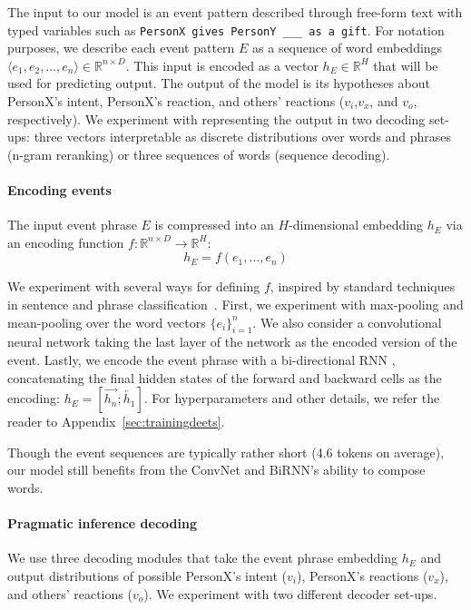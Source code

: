 \documentclass[11pt,a4paper]{article}
\begin{document}
The input to our model is an event pattern described through free-form text with typed variables such as \texttt{PersonX gives PersonY \_\_\_ as a gift}.
For notation purposes, we describe each event pattern $E$ as a sequence of word embeddings $\langle e_1, e_2, \ldots, e_n\rangle \in \mathbb{R}^{n\times D}$.  This input is encoded as a vector $h_E \in \mathbb{R}^H$ that will be used for predicting output.
The output of the model is its hypotheses about PersonX's intent, PersonX's reaction, and others' reactions ($v_i$,$ v_x$, and $v_o$, respectively).  We experiment with representing the output in two decoding set-ups: three vectors interpretable as discrete distributions over words and phrases (n-gram reranking) or three sequences of words (sequence decoding).  


\paragraph{Encoding events}
The input event phrase $E$ is compressed into an $H$-dimensional embedding $h_E$ via an encoding function $f: \mathbb{R}^{n\times D} \rightarrow \mathbb{R}^{H}$:
\[h_E = f(e_1, \ldots, e_n)\]

\noindent
We experiment with several ways for defining $f$, inspired by standard techniques in sentence and phrase classification~\citep{YoonKimPaper}. 
First, we experiment with max-pooling and mean-pooling over the word vectors $\{e_i\}_{i=1}^n$. 
We also consider a convolutional neural network \citep[ConvNet;][]{lecun1998gradient}
taking the last layer of the network as the encoded version of the event.
Lastly, we encode the event phrase with a bi-directional RNN \citep[specifically, a GRU; ][]{Cho2014}, concatenating the final hidden states of the forward and backward cells as the encoding: $h_E = [\overrightarrow{h_n};\overleftarrow{h_1}]$. For hyperparameters and other details, we refer the reader to Appendix~\ref{sec:trainingdeets}.

Though the event sequences are typically rather short (4.6 tokens on average), our model still benefits from the ConvNet and BiRNN's ability to compose words. 


\paragraph{Pragmatic inference decoding}
We use three decoding modules that take the event phrase embedding $h_E$ and output distributions of possible PersonX's intent ($v_i$), PersonX's reactions ($v_x$), and others' reactions ($v_o$). We experiment with two different decoder set-ups.
\end{document}
